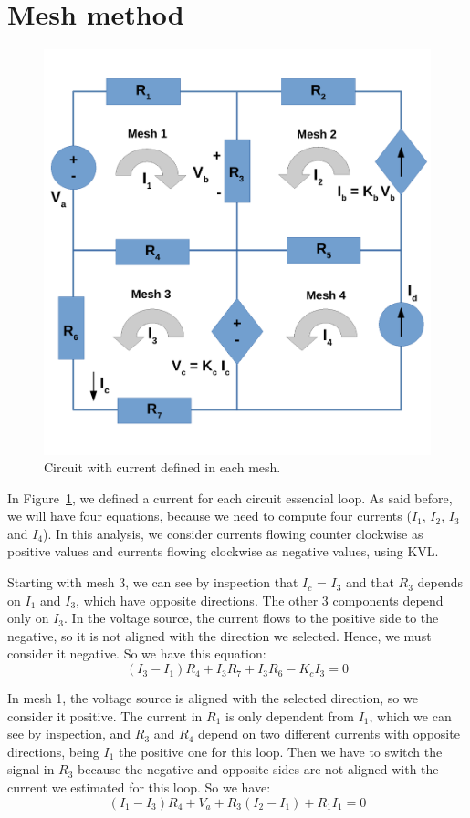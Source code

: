 \section{Mesh method}
\begin{figure}[h] \centering
\includegraphics[width=0.6\linewidth]{Circuit_Mesh.pdf}
\caption{Circuit with current defined in each mesh.}
\label{fig:Circuit_Mesh}
\end{figure}
\noindent In Figure~\ref{fig:Circuit_Mesh}, we defined a current for each circuit essencial loop.
As said before, we will have four equations, because we need to compute four currents
($I_1$, $I_2$, $I_3$ and $I_4$).
In this analysis, we consider currents flowing counter clockwise as positive values and currents flowing clockwise as negative values, using KVL.

\noindent Starting with mesh 3, we can see by inspection that $I_c$ = $I_3$  and that $R_3$  depends on $I_1$  and $I_3$, which have opposite directions. The other 3 components depend only on $I_3$. In the voltage source, the current flows to the positive side to the negative, so it is not aligned with the direction we selected. Hence, we must consider it negative. So we have this equation:
\begin{equation}
(I_3 - I_1)R_4 + I_3R_7+I_3R_6 - K_cI_3  = 0
  \label{eq:kcl_mesh3}
\end{equation}

\noindent In mesh 1, the voltage source is aligned with the selected direction, so we consider it positive. The current in $R_1$ is only dependent from $I_1$, which we can see by inspection, and $R_3$  and $R_4$  depend on two different currents with opposite directions, being $I_1$  the positive one for this loop. Then we have to switch the signal in $R_3$ because the negative and opposite sides are not aligned with the current we estimated for this loop. So we have: 
\begin{equation}
(I_1 - I_3)R_4 + V_a + R_3(I_2 - I_1)+ R_1I_1 = 0
  \label{eq:kcl_mesh1}
\end{equation}

